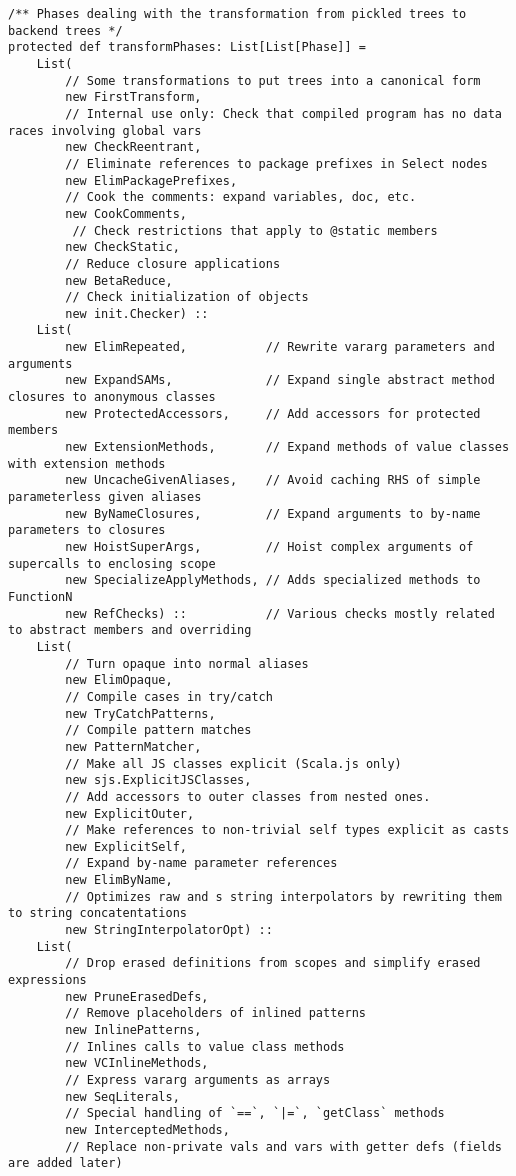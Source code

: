\documentclass[letterpaper,12pt,titlepage,oneside,final]{book}
\begin{document}
\begin{verbatim}
/** Phases dealing with the transformation from pickled trees to backend trees */
protected def transformPhases: List[List[Phase]] =
	List(
		// Some transformations to put trees into a canonical form
		new FirstTransform,
		// Internal use only: Check that compiled program has no data races involving global vars         
		new CheckReentrant,
		// Eliminate references to package prefixes in Select nodes         
		new ElimPackagePrefixes,    
		// Cook the comments: expand variables, doc, etc.
		new CookComments,         
		 // Check restrictions that apply to @static members  
		new CheckStatic,   
		// Reduce closure applications        
		new BetaReduce,      
		// Check initialization of objects       
		new init.Checker) ::        
	List(
		new ElimRepeated,           // Rewrite vararg parameters and arguments
		new ExpandSAMs,             // Expand single abstract method closures to anonymous classes
		new ProtectedAccessors,     // Add accessors for protected members
		new ExtensionMethods,       // Expand methods of value classes with extension methods
		new UncacheGivenAliases,    // Avoid caching RHS of simple parameterless given aliases
		new ByNameClosures,         // Expand arguments to by-name parameters to closures
		new HoistSuperArgs,         // Hoist complex arguments of supercalls to enclosing scope
		new SpecializeApplyMethods, // Adds specialized methods to FunctionN
		new RefChecks) ::           // Various checks mostly related to abstract members and overriding
	List(
	 	// Turn opaque into normal aliases
		new ElimOpaque,            
		// Compile cases in try/catch
		new TryCatchPatterns,      
		// Compile pattern matches
		new PatternMatcher,         
		// Make all JS classes explicit (Scala.js only)
		new sjs.ExplicitJSClasses,  
		// Add accessors to outer classes from nested ones.
		new ExplicitOuter,          
		// Make references to non-trivial self types explicit as casts
		new ExplicitSelf,           
		// Expand by-name parameter references
		new ElimByName,             
		// Optimizes raw and s string interpolators by rewriting them to string concatentations
		new StringInterpolatorOpt) :: 
	List(
	 	// Drop erased definitions from scopes and simplify erased expressions
		new PruneErasedDefs,
		// Remove placeholders of inlined patterns       
		new InlinePatterns,    
		// Inlines calls to value class methods     
		new VCInlineMethods,  
		// Express vararg arguments as arrays      
		new SeqLiterals, 
		// Special handling of `==`, `|=`, `getClass` methods           
		new InterceptedMethods, 
		// Replace non-private vals and vars with getter defs (fields are added later)    

\end{verbatim}
\end{document}
